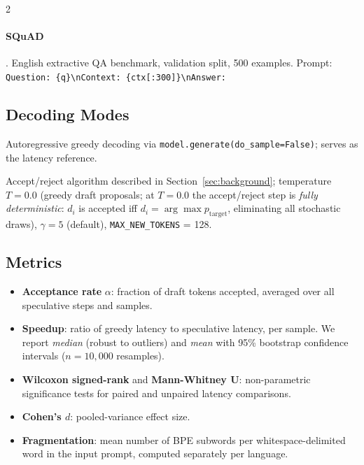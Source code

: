 \documentclass[11pt,a4paper]{article}
\begin{document}
\begin{multicols}{2}
\paragraph{SQuAD} \citep{rajpurkar2016squad}.
English extractive QA benchmark, validation split, 500 examples.
Prompt: \texttt{Question: \{q\}\textbackslash{}nContext: \{ctx[:300]\}\textbackslash{}nAnswer:}

\subsection{Decoding Modes}

\begin{description}[leftmargin=\parindent]
  \item[Greedy baseline] Autoregressive greedy decoding via
        \texttt{model.generate(do\_sample=False)}; serves as the latency
        reference.
  \item[Speculative] Accept/reject algorithm described in
        Section~\ref{sec:background}; temperature $T=0.0$ (greedy draft
        proposals; at $T=0.0$ the accept/reject step is \emph{fully
        deterministic}: $d_i$ is accepted iff $d_i = \arg\max
        p_{\mathrm{target}}$, eliminating all stochastic draws),
        $\gamma = 5$ (default), \texttt{MAX\_NEW\_TOKENS} = 128.
\end{description}

\subsection{Metrics}

\begin{itemize}[leftmargin=*]
  \item \textbf{Acceptance rate} $\alpha$: fraction of draft tokens
        accepted, averaged over all speculative steps and samples.
  \item \textbf{Speedup}: ratio of greedy latency to speculative latency,
        per sample. We report \emph{median} (robust to outliers) and
        \emph{mean} with 95\% bootstrap confidence intervals
        ($n = 10{,}000$ resamples).
  \item \textbf{Wilcoxon signed-rank} and \textbf{Mann-Whitney U}: non-parametric
        significance tests for paired and unpaired latency comparisons.
  \item \textbf{Cohen's $d$}: pooled-variance effect size.
  \item \textbf{Fragmentation}: mean number of BPE subwords per whitespace-delimited
        word in the input prompt, computed separately per language.
\end{itemize}


\end{multicols}
\end{document}
